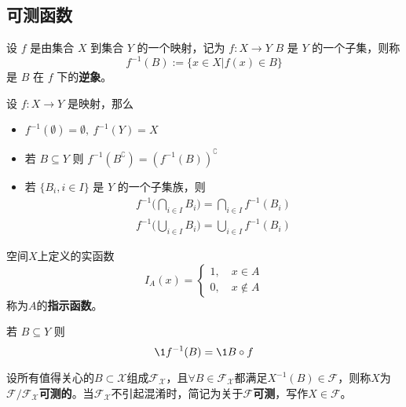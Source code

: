 \subsection{可测函数}

\begin{definition}[逆象]\label{def:inverseimage}
    设 $f$ 是由集合 $X$ 到集合 $Y$ 的一个映射，记为 $f: X \to Y$
    $B$ 是 $Y$ 的一个子集，则称
    \[ f^{-1}(B):= \{ x \in X|f(x) \in B \} \]
    是 $B$ 在 $f$ 下的\textbf{逆象}。
\end{definition}

\begin{theorem}
    设 $f: X \to Y$ 是映射，那么
    \begin{itemize}
        \item $f^{-1}(\emptyset)=\emptyset,\ f^{-1}(Y)=X$
        \item 若 $B\subseteq Y $ 则 $f^{-1}(B^{\complement})=(f^{-1}(B))^{\complement}$
        \item 若 $\{ B_i,i \in I \}$ 是 $Y$ 的一个子集族，则
        \begin{align*}
        f^{-1} \biggl( \bigcap_{i \in I}B_i \biggr)=\bigcap_{i \in I}f^{-1}(B_i) \\
        f^{-1} \biggl( \bigcup_{i \in I}B_i \biggr)=\bigcup_{i \in I}f^{-1}(B_i)
        \end{align*}
    \end{itemize}
\end{theorem}

\begin{definition}\label{def:indicator_function}
    空间$X$上定义的实函数
    \[ I_{A}(x)=\begin{cases}
            1, \quad x \in A \\
            0, \quad x \notin A
        \end{cases} \]
    称为$A$的\textbf{指示函数}。
\end{definition}

\begin{proposition}
    若 $B\subseteq Y $ 则
    \[ \1{f^{-1}(B)}=\1{B} \circ f \]
\end{proposition}

\begin{definition}[可测函数]
    
\end{definition}


\begin{definition}[可测性]
    设所有值得关心的$B\subset \mathcal{X}$组成$\mathscr{F}_{\mathcal{X}}$，且$\forall B \in \mathscr{F}_{\mathcal{X}}$都满足$X^{-1}(B) \in \mathscr{F}$，则称$X$为$\mathscr{F}/\mathscr{F}_{\mathcal{X}}$\textbf{可测的}。当$\mathscr{F}_{\mathcal{X}}$不引起混淆时，简记为关于$\mathscr{F}$\textbf{可测}，写作$X \in \mathscr{F}$。
\end{definition}


